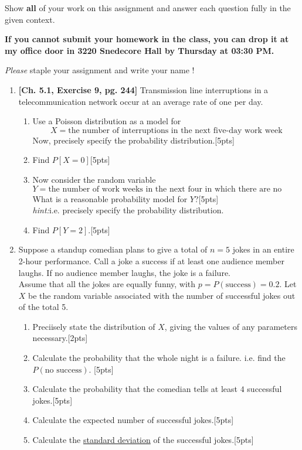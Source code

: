 \documentclass[11pt]{article}\usepackage[]{graphicx}\usepackage[]{color}
\begin{document}

\pagestyle{fancy} 

Show \textbf{all} of your work on this assignment and answer each question fully in the given context. 

\vspace{0.3cm}

\textbf{If you cannot submit your homework in the class, you can drop it at my office door in 3220 Snedecore Hall by Thursday at 03:30 PM.}

\vspace{0.3cm}

\emph{Please} staple your assignment and write your name !

\begin{enumerate}
	
  \item \textbf{[Ch. 5.1, Exercise 9, pg. 244]} Transmission line interruptions in a telecommunication network occur at an average rate of one per day.
    \begin{enumerate}
      \item Use a Poisson distribution as a model for
        $$
        X = \text{the number of interruptions in the next five-day work week}
        $$
      Now, precisely specify the probability distribution.[5pts]
      \item Find $P[X = 0]$[5pts]
      \item Now consider the random variable
        $$
        Y = \text{the number of work weeks in the next four in which there are no interruptions}
        $$
        What is a reasonable probability model for $Y$?[5pts]\\
        \emph{hint:}i.e. precisely specify the probability distribution.
        
      \item Find $P[Y = 2]$.[5pts]
	\end{enumerate}
	\item Suppose a standup comedian plans to give a total of $n=5$ jokes in an entire 2-hour performance. Call a joke a success if at least one audience member laughs. If no audience member laughs, the joke is a failure.\\
	Assume that all the jokes are equally funny, with $p= P(\text{success}) = 0.2$. Let $X$ be the random variable associated with the number of successful jokes out of the total 5. 
	\begin{enumerate}
	  \item Preciisely state the distribution of $X$, giving the values of any parameters necessary.[2pts]
	  \item Calculate the probability that the whole night is a failure. i.e. find the $P(\text{no success})$. [5pts]
	  \item Calculate the probability that the comedian tells at least $4$ successful jokes.[5pts]
	  \item Calculate the expected number of successful jokes.[5pts]
	  \item Calculate the \underline{standard deviation} of the successful jokes.[5pts]
	  

\end{enumerate}
\end{enumerate}
\end{document}
